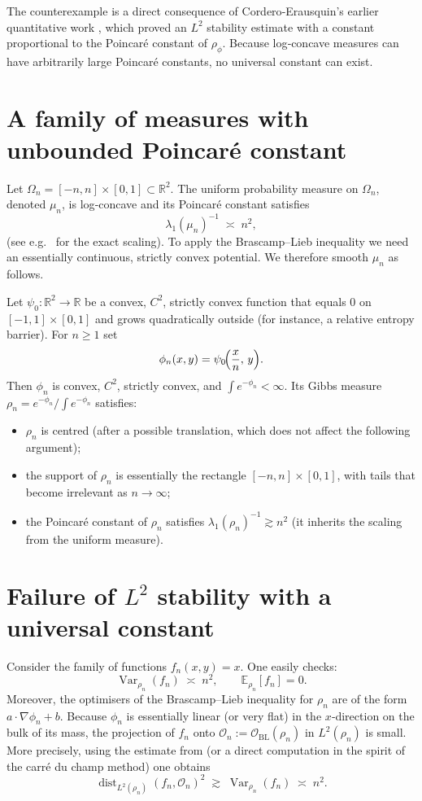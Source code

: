 \documentclass{article}
\theoremstyle{definition}
\theoremstyle{remark}
\DeclareMathOperator{\Var}{Var}
\DeclareMathOperator{\dist}{dist}
\begin{document}
The counterexample is a direct consequence of Cordero‑Erausquin's earlier quantitative work \cite{CE17},
which proved an $L^2$ stability estimate with a constant proportional to the Poincar\'e constant
of $\rho_\phi$.  Because log‑concave measures can have arbitrarily large Poincar\'e constants,
no universal constant can exist.

\section{A family of measures with unbounded Poincar\'e constant}
Let $\Omega_n = [-n,n]\times[0,1]\subset\mathbb{R}^2$.  The uniform probability measure on $\Omega_n$,
denoted $\mu_n$, is log‑concave and its Poincar\'e constant satisfies
\begin{equation}\label{eq:Poincare}
\lambda_1(\mu_n)^{-1} \;\asymp\; n^2 ,
\end{equation}
(see e.g.\ \cite{BGL13} for the exact scaling).  To apply the Brascamp--Lieb inequality we need an
essentially continuous, strictly convex potential.  We therefore smooth $\mu_n$ as follows.

Let $\psi_0:\mathbb{R}^2\to\mathbb{R}$ be a convex, $C^2$, strictly convex function that equals $0$ on
$[-1,1]\times[0,1]$ and grows quadratically outside (for instance, a relative entropy barrier).
For $n\ge1$ set
\[
\phi_n(x,y)= \psi_0\!\Bigl(\frac{x}{n},\,y\Bigr).
\]
Then $\phi_n$ is convex, $C^2$, strictly convex, and $\int e^{-\phi_n}<\infty$.  Its Gibbs measure
$\rho_n = e^{-\phi_n}/\int e^{-\phi_n}$ satisfies:
\begin{itemize}
\item $\rho_n$ is centred (after a possible translation, which does not affect the following argument);
\item the support of $\rho_n$ is essentially the rectangle $[-n,n]\times[0,1]$, with tails that become
irrelevant as $n\to\infty$;
\item the Poincar\'e constant of $\rho_n$ satisfies
$\lambda_1(\rho_n)^{-1}\gtrsim n^2$ (it inherits the scaling from the uniform measure).
\end{itemize}

\section{Failure of $L^2$ stability with a universal constant}
Consider the family of functions $f_n(x,y)=x$.  One easily checks:
\[
\Var_{\rho_n}(f_n) \;\asymp\; n^2 ,\qquad
\mathbb{E}_{\rho_n}[f_n]=0 .
\]
Moreover, the optimisers of the Brascamp--Lieb inequality for $\rho_n$ are of the form
$a\cdot\nabla\phi_n+b$.  Because $\phi_n$ is essentially linear (or very flat) in the $x$‑direction
on the bulk of its mass, the projection of $f_n$ onto $\mathcal{O}_n:=\mathcal{O}_{\mathrm{BL}}(\rho_n)$
in $L^2(\rho_n)$ is small.  More precisely, using the estimate from \cite{CE17} (or a direct computation
in the spirit of the carr\'e du champ method) one obtains
\begin{equation}\label{eq:gap}
\dist_{L^2(\rho_n)}(f_n,\mathcal{O}_n)^2 \;\gtrsim\; \Var_{\rho_n}(f_n) \;\asymp\; n^2 .
\end{equation}
\end{document}
